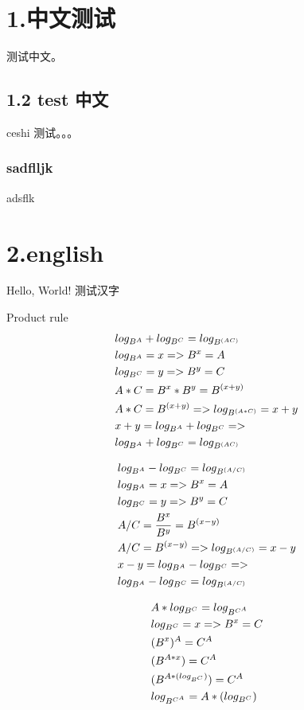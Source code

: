 \documentclass[a4paper,10pt]{book}
\begin{document}
  \section{1.中文测试}
    测试中文。
    \subsection{1.2 test 中文}
      ceshi 测试。。。
      \subsubsection{sadflljk}
        adsflk
  \section{2.english}
Hello, World! 测试汉字

Product rule
\begin{align}
  & log_{B^{A}} + log_{B^{C}} = log_{B^{(AC)}} \notag \\
  & log_{B^{A}} = x => B^x = A \notag \\
  & log_{B^{C}} = y => B^y = C \notag \\
  & A*C = B^x * B^y = B^{(x+y)} \notag \\
  & A*C = B^{(x+y)} => log_{B^{(A*C)}} = x+y \notag \\
  & x+y = log_{B^{A}} + log_{B^{C}} => \notag \\
  & log_{B^{A}} + log_{B^{C}} = log_{B^{(AC)}} \notag
\end{align}

\begin{align}
  & log_{B^{A}} - log_{B^{C}} = log_{B^{(A/C)}} \notag \\
  & log_{B^{A}} = x => B^x = A \notag \\
  & log_{B^{C}} = y => B^y = C \notag \\
  & A/C = \frac{B^x}{B^y} = B^{(x-y)} \notag \\
  & A/C = B^{(x-y)} => log_{B^{(A/C)}} = x-y \notag \\
  & x-y = log_{B^{A}} - log_{B^{C}} => \notag \\
  & log_{B^{A}} - log_{B^{C}} = log_{B^{(A/C)}} \notag
\end{align}

\begin{align}
  & A*log_{B^{C}} = log_{B^{C^{A}}} \notag \\
  & log_{B^{C}} = x => B^x = C \notag \\
  & (B^{x})^{A} = C^{A} \notag \\
  & (B^{A*x}) = C^{A} \notag \\
  & (B^{A*(log_{B^{C}})}) = C^{A} \notag \\
  & log_{B^{C^{A}}} = A*(log_{B^{C}}) \notag
\end{align}
\end{document}
